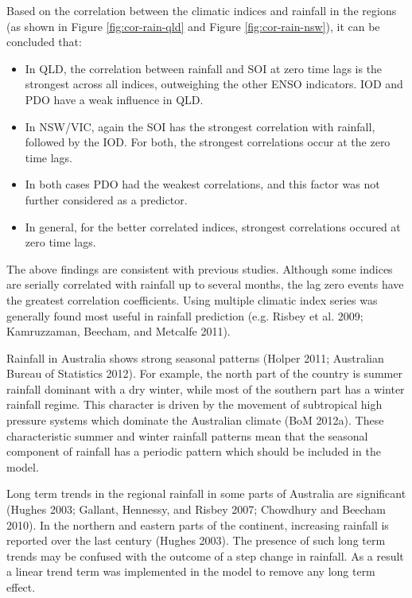 \documentclass[fleqn,10pt,lineno]{wlpeerj} %
\begin{document}
Based on the correlation between the climatic indices and rainfall in
the regions (as shown in Figure \ref{fig:cor-rain-qld} and Figure
\ref{fig:cor-rain-nsw}), it can be concluded that:

\begin{itemize}
  \setlength{\itemsep}{0cm}
  \setlength{\parskip}{0cm}
  \item In QLD, the correlation between rainfall and SOI at zero time lags is the strongest across all indices, outweighing the other ENSO indicators. IOD and PDO have a weak influence in QLD.
  \item In NSW/VIC, again the SOI has the strongest correlation with rainfall, followed by the IOD. For both, the strongest correlations occur at the zero time lags. 
  \item In both cases PDO had the weakest correlations, and this factor was not further considered as a predictor.
  \item In general, for the better correlated indices, strongest correlations occured at zero time lags.
\end{itemize}

The above findings are consistent with previous studies. Although some
indices are serially correlated with rainfall up to several months, the
lag zero events have the greatest correlation coefficients. Using
multiple climatic index series was generally found most useful in
rainfall prediction (e.g. Risbey et al. 2009; Kamruzzaman, Beecham, and
Metcalfe 2011).

Rainfall in Australia shows strong seasonal patterns (Holper 2011;
Australian Bureau of Statistics 2012). For example, the north part of
the country is summer rainfall dominant with a dry winter, while most of
the southern part has a winter rainfall regime. This character is driven
by the movement of subtropical high pressure systems which dominate the
Australian climate (BoM 2012a). These characteristic summer and winter
rainfall patterns mean that the seasonal component of rainfall has a
periodic pattern which should be included in the model.

Long term trends in the regional rainfall in some parts of Australia are
significant (Hughes 2003; Gallant, Hennessy, and Risbey 2007; Chowdhury
and Beecham 2010). In the northern and eastern parts of the continent,
increasing rainfall is reported over the last century (Hughes 2003). The
presence of such long term trends may be confused with the outcome of a
step change in rainfall. As a result a linear trend term was implemented
in the model to remove any long term effect.
\end{document}
